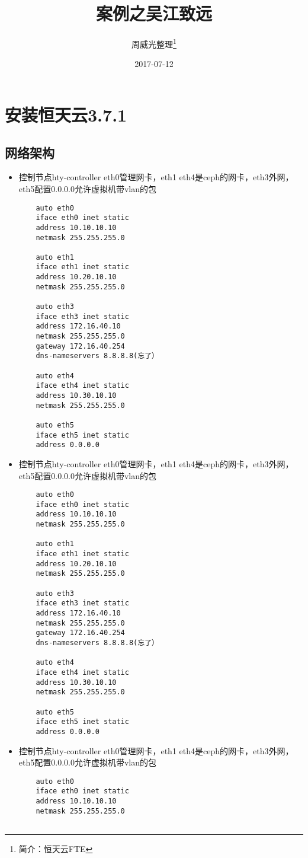 \documentclass[a4paper,left=1.5cm,right=1.5cm,11pt]{article}
\title{案例之吴江致远}
\author{周威光整理\footnote{简介：恒天云FTE}}
\date{2017-07-12}
\begin{document}
\maketitle
\clearpage
\tableofcontents
\clearpage

\section{安装恒天云3.7.1}
\subsection{网络架构}
\begin{itemize}
	\item[1]控制节点hty-controller
	eth0管理网卡，eth1 eth4是ceph的网卡，eth3外网，eth5配置0.0.0.0允许虚拟机带vlan的包
	\begin{lstlisting}
	auto eth0
	iface eth0 inet static
	address 10.10.10.10
	netmask 255.255.255.0

	auto eth1
	iface eth1 inet static
	address 10.20.10.10
	netmask 255.255.255.0

	auto eth3
	iface eth3 inet static
	address 172.16.40.10
	netmask 255.255.255.0
	gateway 172.16.40.254
	dns-nameservers 8.8.8.8(忘了）
	
	auto eth4
	iface eth4 inet static
	address 10.30.10.10
	netmask 255.255.255.0

	auto eth5
	iface eth5 inet static
	address 0.0.0.0
	\end{lstlisting}

	\item[1]控制节点hty-controller
	eth0管理网卡，eth1 eth4是ceph的网卡，eth3外网，eth5配置0.0.0.0允许虚拟机带vlan的包
	\begin{lstlisting}
	auto eth0
	iface eth0 inet static
	address 10.10.10.10
	netmask 255.255.255.0

	auto eth1
	iface eth1 inet static
	address 10.20.10.10
	netmask 255.255.255.0

	auto eth3
	iface eth3 inet static
	address 172.16.40.10
	netmask 255.255.255.0
	gateway 172.16.40.254
	dns-nameservers 8.8.8.8(忘了）
	
	auto eth4
	iface eth4 inet static
	address 10.30.10.10
	netmask 255.255.255.0

	auto eth5
	iface eth5 inet static
	address 0.0.0.0
	\end{lstlisting}

	\item[1]控制节点hty-controller
	eth0管理网卡，eth1 eth4是ceph的网卡，eth3外网，eth5配置0.0.0.0允许虚拟机带vlan的包
	\begin{lstlisting}
	auto eth0
	iface eth0 inet static
	address 10.10.10.10
	netmask 255.255.255.0


\end{lstlisting}
\end{itemize}
\end{document}

